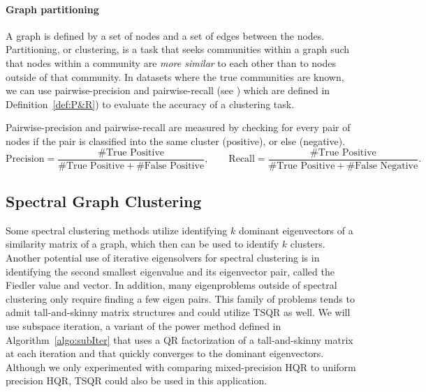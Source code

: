 \documentclass[review,onefignum,onetabnum]{siamart190516}
\begin{document}
\paragraph{Graph partitioning} A graph is defined by a set of nodes and a set of edges between the nodes.
Partitioning, or clustering, is a task that seeks communities within a graph such that nodes within a community are \emph{more similar} to each other than to nodes outside of that community. 
In datasets where the true communities are known, we can use pairwise-precision and pairwise-recall (see \cite{GraphChallenge})  which are defined in Definition~\ref{def:P&R}) to evaluate the accuracy of a clustering task.
\begin{definition}
	\label{def:P&R}
    Pairwise-precision and pairwise-recall are measured by checking for every pair of nodes if the pair is classified into the same cluster (positive), or else (negative).
	\begin{equation}
	\text{Precision} = \frac{\#\text{True Positive}}{\#\text{True Positive}+\#\text{False Positive}}, 
	\qquad
	\text{Recall} = \frac{\#\text{True Positive}}{\#\text{True Positive}+\#\text{False Negative}}.
	\end{equation}
\end{definition}

\subsection{Spectral Graph Clustering}
\label{sec:cluster}
Some spectral clustering methods utilize identifying $k$ dominant eigenvectors of a similarity matrix of a graph, which then can be used to identify $k$ clusters. 
Another potential use of iterative eigensolvers for spectral clustering is in identifying the second smallest eigenvalue and its eigenvector pair, called the Fiedler value and vector.
In addition, many eigenproblems outside of spectral clustering only require finding a few eigen pairs.
This family of problems tends to admit tall-and-skinny matrix structures and could utilize TSQR as well. 
We will use subspace iteration, a variant of the power method defined in Algorithm~\ref{algo:subIter} that uses a QR factorization of a tall-and-skinny matrix at each iteration and that quickly converges to the dominant eigenvectors.
Although we only experimented with comparing mixed-precision HQR to uniform precision HQR, TSQR could also be used in this application. 
\par
\end{document}
